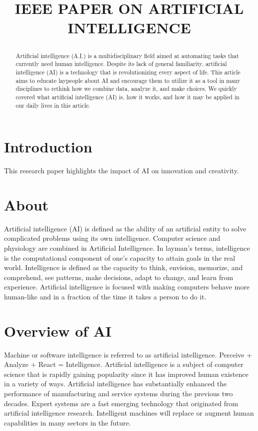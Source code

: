 \documentclass[conference]{IEEEtran}
\title{\begin{LARGE}\textbf{IEEE PAPER ON ARTIFICIAL INTELLIGENCE}\end{LARGE}}
\author{\IEEEauthorblockN{Avani Shah}
\IEEEauthorblockA{\textit{Second Year Computer Engineering} \\
\textit{COEP Technological University}\\
MIS: 112103128 \\
Mail id: shahaa21.comp@coep.ac.in}}
\begin{document}
\maketitle

\begin{abstract}
Artificial intelligence (A.I.) is a multidisciplinary field aimed at automating tasks that currently need human intelligence. Despite its lack of general familiarity, artificial intelligence (AI) is a technology that is revolutionizing every aspect of life. This article aims to educate laypeople about AI and encourage them to utilize it as a tool in many disciplines to rethink how we combine data, analyze it, and make choices. We quickly covered what artificial intelligence (AI) is, how it works, and how it may be applied in our daily lives in this article.\\
\end{abstract}

\section{Introduction}
This research paper highlights the impact of AI on innovation and creativity.\\

\section{About}
Artificial intelligence (AI) is defined as the ability of an artificial entity to solve complicated problems using its own intelligence. Computer science and physiology are combined in Artificial Intelligence. In layman's terms, intelligence is the computational component of one's capacity to attain goals in the real world. Intelligence is defined as the capacity to think, envision, memorize, and comprehend, see patterns, make decisions, adapt to change, and learn from experience. Artificial intelligence is focused with making computers behave more human-like and in a fraction of the time it takes a person to do it.\\

\section{Overview of AI}
Machine or software intelligence is referred to as artificial intelligence. Perceive + Analyze + React = Intelligence. Artificial intelligence is a subject of computer science that is rapidly gaining popularity since it has improved human existence in a variety of ways. Artificial intelligence has substantially enhanced the performance of manufacturing and service systems during the previous two decades. Expert systems are a fast emerging technology that originated from artificial intelligence research. Intelligent machines will replace or augment human capabilities in many sectors in the future.\\
\end{document}
